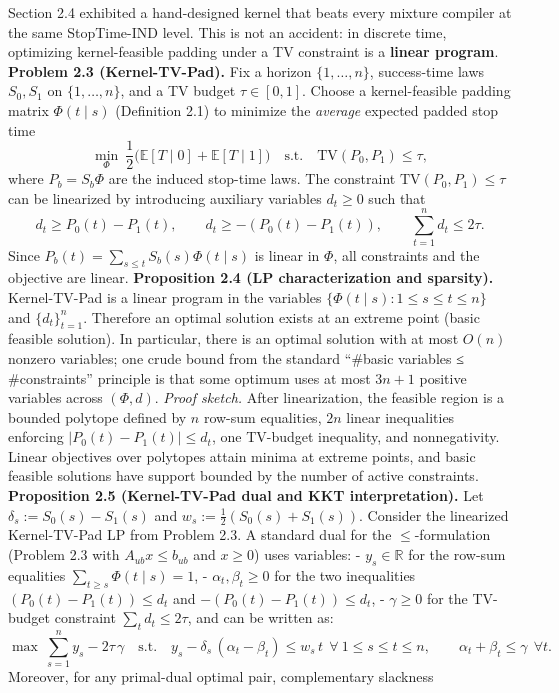 \documentclass[11pt]{article}
\begin{document}
Section 2.4 exhibited a hand-designed kernel that beats every mixture
compiler at the same StopTime-IND level. This is not an accident: in
discrete time, optimizing kernel-feasible padding under a TV constraint
is a \textbf{linear program}. \textbf{Problem 2.3 (Kernel-TV-Pad).} Fix
a horizon \(\{1,\dots,n\}\), success-time laws \(S_0,S_1\) on
\(\{1,\dots,n\}\), and a TV budget \(\tau\in[0,1]\). Choose a
kernel-feasible padding matrix \(\Phi(t\mid s)\) (Definition 2.1) to
minimize the \emph{average} expected padded stop time \[
\min_{\Phi}\ \frac12\bigl(\mathbb{E}[T\mid 0]+\mathbb{E}[T\mid 1]\bigr)
\quad\text{s.t.}\quad
\mathrm{TV}(P_0,P_1)\le \tau,
\] where \(P_b = S_b\Phi\) are the induced stop-time laws. The
constraint \(\mathrm{TV}(P_0,P_1)\le\tau\) can be linearized by
introducing auxiliary variables \(d_t\ge 0\) such that \[
 d_t \ge P_0(t)-P_1(t),\qquad d_t \ge -(P_0(t)-P_1(t)),\qquad \sum_{t=1}^n d_t \le 2\tau.
\] Since \(P_b(t)=\sum_{s\le t} S_b(s)\Phi(t\mid s)\) is linear in
\(\Phi\), all constraints and the objective are linear.
\textbf{Proposition 2.4 (LP characterization and sparsity).}
Kernel-TV-Pad is a linear program in the variables
\(\{\Phi(t\mid s):1\le s\le t\le n\}\) and \(\{d_t\}_{t=1}^n\).
Therefore an optimal solution exists at an extreme point (basic feasible
solution). In particular, there is an optimal solution with at most
\(O(n)\) nonzero variables; one crude bound from the standard ``\#basic
variables ≤ \#constraints'' principle is that some optimum uses at most
\(3n+1\) positive variables across \((\Phi,d)\). \emph{Proof sketch.}
After linearization, the feasible region is a bounded polytope defined
by \(n\) row-sum equalities, \(2n\) linear inequalities enforcing
\(|P_0(t)-P_1(t)|\le d_t\), one TV-budget inequality, and nonnegativity.
Linear objectives over polytopes attain minima at extreme points, and
basic feasible solutions have support bounded by the number of active
constraints. \textbf{Proposition 2.5 (Kernel-TV-Pad dual and KKT
interpretation).} Let \(\delta_s:= S_0(s)-S_1(s)\) and
\(w_s:=\tfrac12(S_0(s)+S_1(s))\). Consider the linearized Kernel-TV-Pad
LP from Problem 2.3. A standard dual for the \(\le\)-formulation
(Problem 2.3 with \(A_{ub}x\le b_{ub}\) and \(x\ge 0\)) uses variables:
- \(y_s\in\mathbb{R}\) for the row-sum equalities
\(\sum_{t\ge s}\Phi(t\mid s)=1\), - \(\alpha_t,\beta_t\ge 0\) for the
two inequalities \((P_0(t)-P_1(t))\le d_t\) and
\(-(P_0(t)-P_1(t))\le d_t\), - \(\gamma\ge 0\) for the TV-budget
constraint \(\sum_t d_t\le 2\tau\), and can be written as: \[
\max\ \sum_{s=1}^n y_s - 2\tau\,\gamma
\quad\text{s.t.}\quad
y_s - \delta_s\,(\alpha_t-\beta_t) \le w_s\,t\ \ \forall\ 1\le s\le t\le n,\qquad
\alpha_t+\beta_t\le \gamma\ \ \forall t.
\] Moreover, for any primal-dual optimal pair, complementary slackness
\end{document}
